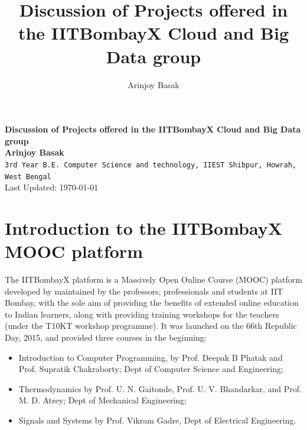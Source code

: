 \documentclass[14pt]{article}
\title{Discussion of Projects offered in the IITBombayX Cloud and Big Data group}
\author{Arinjoy Basak}
\begin{document}
\begin{titlepage}
 \begin{center}
\Huge
\textbf{Discussion of Projects offered in the IITBombayX Cloud and Big Data group} \\
\vfill
\LARGE
\textbf{Arinjoy Basak}\\
\texttt{3rd Year B.E. Computer Science and technology, IIEST Shibpur, Howrah, West Bengal}\\
\vfill
\Large
Last Updated: \today
\end{center}
\end{titlepage}


\pagebreak
\setcounter{page}{1}





\tableofcontents

\pagebreak

\setcounter{page}{1}


\section{Introduction to the IITBombayX MOOC platform}

The IITBombayX platform is a Massively Open Online Course (MOOC) platform developed by maintained by the professors, professionals and students at IIT Bombay, with the sole aim of providing the benefits of extended online education to Indian learners, along with providing training workshops for the teachers (under the T10KT workshop programme). It was launched on	 the 66th Republic Day, 2015, and provided three courses in the beginning:\cite{IITBombayX}

\begin{itemize}
 \item Introduction to Computer Programming, by Prof. Deepak B Phatak and Prof. Supratik Chakraborty; Dept of Computer Science and Engineering;
 \item Thermodynamics by Prof. U. N. Gaitonde, Prof. U. V. Bhandarkar, and Prof. M. D. Atrey; Dept of Mechanical Engineering; 
 \item Signals and Systems by Prof. Vikram Gadre, Dept of Electrical Engineering.
\end{itemize}
\end{document}
